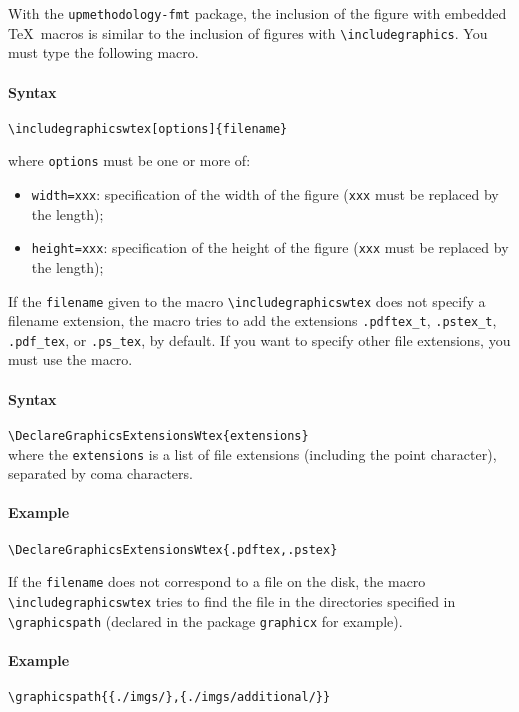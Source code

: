 \documentclass[book,taskpackage,specpackage,codepackage]{upmethodology-document}
\begin{document}
With the \texttt{upmethodology-fmt} package, the inclusion of the figure with embedded \TeX\ macros is similar to the inclusion of figures with \texttt{{\textbackslash}includegraphics}. You must type the following macro.

\paragraph{Syntax} \texttt{{\textbackslash}includegraphicswtex[options]\{filename\}}

where \texttt{options} must be one or more of: \begin{itemize}
\item \texttt{width=xxx}: specification of the width of the figure (\texttt{xxx} must be replaced by the length);
\item \texttt{height=xxx}: specification of the height of the figure (\texttt{xxx} must be replaced by the length);
\end{itemize}

If the \texttt{filename} given to the macro \texttt{{\textbackslash}includegraphicswtex} does not specify a filename extension, the macro tries to add the extensions \texttt{.pdftex\_t}, \texttt{.pstex\_t}, \texttt{.pdf\_tex}, or \texttt{.ps\_tex}, by default. If you want to specify other file extensions, you must use the macro.

\paragraph{Syntax} \texttt{{\textbackslash}DeclareGraphicsExtensionsWtex\{extensions\}} \\
where the \texttt{extensions} is a list of file extensions (including the point character), separated by coma characters.

\paragraph{Example} \texttt{{\textbackslash}DeclareGraphicsExtensionsWtex\{.pdftex,.pstex\}}

If the \texttt{filename} does not correspond to a file on the disk, the macro \texttt{{\textbackslash}includegraphicswtex} tries to find the file in the directories specified in \texttt{{\textbackslash}graphicspath} (declared in the package \texttt{graphicx} for example). \\

\paragraph{Example} \texttt{{\textbackslash}graphicspath\{\{./imgs/\},\{./imgs/additional/\}\}} \\
\end{document}
